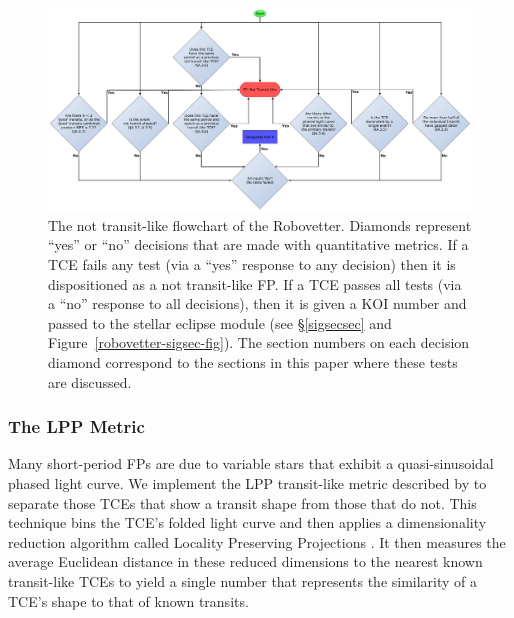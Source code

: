 \begin{figure}[ht]
\centering
\includegraphics[width=\linewidth]{RoboVetter-Diagram-V4-TransitLike.pdf}
\caption{The not transit-like flowchart of the Robovetter. Diamonds represent ``yes'' or ``no'' decisions that are made with quantitative metrics. If a TCE fails any test (via a ``yes'' response to any decision) then it is dispositioned as a not transit-like FP. If a TCE passes all tests (via a ``no'' response to all decisions), then it is given a KOI number and passed to the stellar eclipse module (see \S\ref{sigsecsec} and Figure~\ref{robovetter-sigsec-fig}). The section numbers on each decision diamond correspond to the sections in this paper where these tests are discussed.}
\label{robovetter-transitlike-fig}
\end{figure}





\subsubsection{The LPP Metric}
\label{s:lpp}

Many short-period FPs are due to variable stars that exhibit a quasi-sinusoidal phased light curve. We implement the LPP transit-like metric described by \citet{Thompson2015b} to separate those TCEs that show a transit shape from those that do not. This technique bins the TCE's folded light curve and then applies a dimensionality reduction algorithm called Locality Preserving Projections \citep[LPP, ][]{He2004}.  It then measures the average Euclidean distance in these reduced dimensions to the nearest known transit-like TCEs to yield a single number that represents the similarity of a TCE's shape to that of known transits. 

